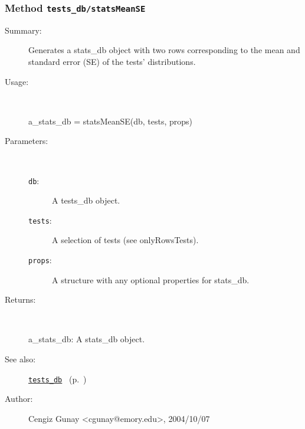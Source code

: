 \subsubsection[Method \texttt{statsMeanSE}]{Method \texttt{tests\_db/statsMeanSE}}%
%
\label{ref_tests_db__statsMeanSE}%
\hypertarget{ref_tests_db__statsMeanSE}{}%
\begin{description}
\item[Summary:]Generates a stats\_db object with two rows corresponding to 
		the mean and standard error (SE) of the tests' distributions.
%
\item[Usage:]~%
\begin{lyxcode}%
a\_stats\_db = statsMeanSE(db, tests, props)
%
\end{lyxcode}%
%
%
\item[Parameters:]~
\begin{description}%
\item[\texttt{db}:]
 A tests\_db object.
\item[\texttt{tests}:]
 A selection of tests (see onlyRowsTests).
\item[\texttt{props}:]
 A structure with any optional properties for stats\_db.
\end{description}%
%
\item[Returns:
]~

	a\_stats\_db: A stats\_db object.
%
%
\item[See also:]%
\hyperlink{ref_tests_db}{\texttt{tests\_db}}%
\ (p.~\pageref{ref_tests_db})%
%
%
\item[Author:]%
Cengiz Gunay <cgunay@emory.edu>, 2004/10/07
%
\end{description}
\methodline%
